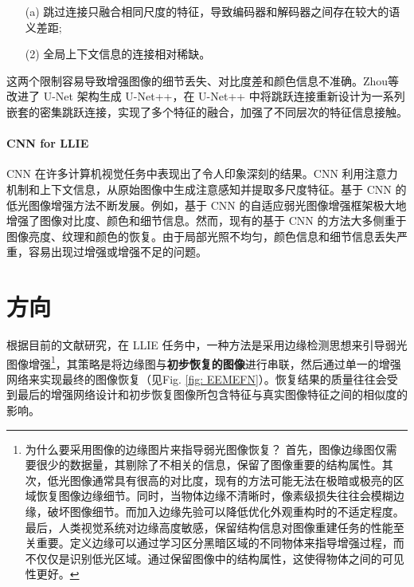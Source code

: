 \documentclass[a4paper, 10pt]{article}
\begin{document}
	\begin{itemize}
		\item[(a)] 
		跳过连接只融合相同尺度的特征，导致编码器和解码器之间存在较大的语义差距;
		
		\item[(2)]
		全局上下文信息的连接相对稀缺。
	\end{itemize}	
	
	这两个限制容易导致增强图像的细节丢失、对比度差和颜色信息不准确。Zhou等\cite{zhou2018unet++,zhou2019unet++}改进了 U-Net 架构生成 U-Net++，在 U-Net++ 中将跳跃连接重新设计为一系列嵌套的密集跳跃连接，实现了多个特征的融合，加强了不同层次的特征信息接触。
	
	\paragraph{CNN for LLIE}
	
	CNN 在许多计算机视觉任务中表现出了令人印象深刻的结果。CNN 利用注意力机制\cite{yang2021locally, zhang2020attention}和上下文信息，从原始图像中生成注意感知并提取多尺度特征\cite{li2018multi,zamir2020learning}。基于 CNN 的低光图像增强方法不断发展。例如，基于 CNN 的自适应弱光图像增强框架\cite{li2020visual}极大地增强了图像对比度、颜色和细节信息。然而，现有的基于 CNN 的方法大多侧重于图像亮度、纹理和颜色的恢复\cite{xu2020learning}。由于局部光照不均匀，颜色信息和细节信息丢失严重，容易出现过增强或增强不足的问题。
	
	\section{方向}
	
	根据目前的文献研究，在 LLIE 任务中，一种方法是采用边缘检测思想来引导弱光图像增强\footnote{为什么要采用图像的边缘图片来指导弱光图像恢复？
		首先，图像边缘图仅需要很少的数据量，其剔除了不相关的信息，保留了图像重要的结构属性。其次，低光图像通常具有很高的对比度，现有的方法可能无法在极暗或极亮的区域恢复图像边缘细节。同时，当物体边缘不清晰时，像素级损失往往会模糊边缘，破坏图像细节。而加入边缘先验可以降低优化外观重构时的不适定程度。最后，人类视觉系统对边缘高度敏感，保留结构信息对图像重建任务的性能至关重要。定义边缘可以通过学习区分黑暗区域的不同物体来指导增强过程，而不仅仅是识别低光区域。通过保留图像中的结构属性，这使得物体之间的可见性更好。}，其策略是将边缘图与\textbf{初步恢复的图像}进行串联，然后通过单一的增强网络来实现最终的图像恢复（见Fig. \ref{fig: EEMEFN}）。恢复结果的质量往往会受到最后的增强网络设计和初步恢复图像所包含特征与真实图像特征之间的相似度的影响。
	
\end{document}
